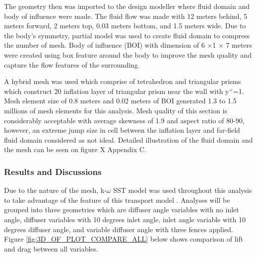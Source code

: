 \noindent The geometry then was imported to the design modeller where fluid domain and body of influence were made. The fluid flow was made with 12 meters behind, 5 meters forward, 2 meters top, 0.03 meters bottom, and 1.5 meters wide. Due to the body's symmetry, partial model was used to create fluid domain to compress the number of mesh. Body of influence (BOI) with dimension of  6 $\times$1 $\times$ 7 meters were created using box feature around the body to improve the mesh quality and capture the flow features of the surrounding.  

\noindent A hybrid mesh was used which comprise of tetrahedron and triangular prisms which construct 20 inflation layer of triangular prism near the wall with y$^+$=1.  Mesh element size of 0.8 meters and 0.02 meters of BOI generated 1.3 to 1.5 millions of mesh elements for this analysis. Mesh quality of this section is considerably acceptable with average skewness of 1.9 and aspect ratio of 80-90, however, an extreme jump size in cell between the inflation layer and far-field fluid domain  considered as not ideal. Detailed illustration of the fluid domain and the mesh can be seen on figure X Appendix C.

\subsubsection{Results and Discussions}
Due to the nature of the mesh, k-$\omega$ SST model was used throughout this analysis to take advantage of the feature of this transport model \cite{Ansys2006ModelingFlows}. Analyses will be grouped into three geometries which are diffuser angle variables with no inlet angle, diffuser variables with 10 degrees inlet angle, inlet angle variable with 10 degrees diffuser angle, and variable diffuser angle with three fences applied.  Figure \ref{fig:3D_OF_PLOT_COMPARE_ALL} below shows comparison of lift and drag between all variables.

